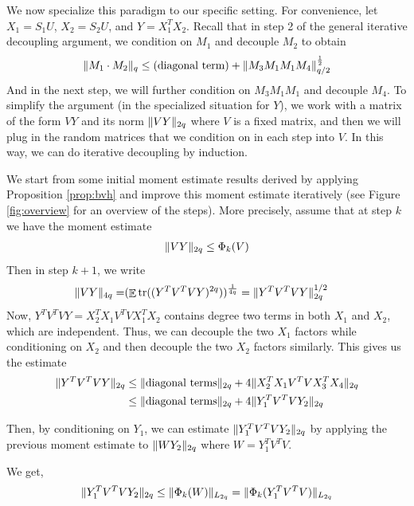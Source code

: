 \documentclass[11pt]{amsart}
\numberwithin{equation}{section}
\numberwithin{equation}{section}
\DeclareMathOperator{\E}{\mathbb{E}}
\DeclareMathOperator*{\tr}{tr}
\DeclarePairedDelimiter{\norm}{\lVert}{\rVert}
\begin{document}
We now specialize this paradigm to our specific setting. For convenience, let $X_1=S_1U$, $X_2=S_2U$, and $Y=X_1^TX_2$. Recall that in step 2 of the general iterative decoupling argument, we condition on $M_1$ and decouple $M_2$ to obtain
\begin{align*}
    \norm{M_1 \cdot M_2}_{q} \le \text{(diagonal term)}+\norm{M_3M_1M_1M_4}_{q/2}^\frac{1}{2}
\end{align*}
And in the next step, we will further condition on $M_3M_1M_1$ and decouple $M_4$.
To simplify the argument (in the specialized situation for $Y$), we work with a matrix of the form $VY$ and its norm $\norm{VY}_{2q}$ where $V$ is a fixed matrix, and then we will plug in the random matrices that we condition on in each step  into $V$. In this way, we can do iterative decoupling by induction.



We start from some initial moment estimate results derived by applying Proposition \ref{prop:bvh} and improve this moment estimate iteratively (see Figure \ref{fig:overview} for an overview of the steps).  More precisely, assume that at step $k$ we have the moment estimate
\begin{align*}
    \norm{VY}_{2q} \le \Phi_{k}(V)
\end{align*}
Then in step $k+1$, we write 
\begin{align*}
    \norm{VY}_{4q}=&(\E\tr((Y^TV^TVY)^{2q}))^{\frac{1}{4q}}= \norm{Y^TV^TVY}_{2q}^{1/2}
\end{align*}
Now, $Y^TV^TVY = X_2^TX_1V^TVX_1^TX_2$ contains degree two terms in both $X_1$ and $X_2$, which are independent. Thus, we can decouple the two $X_1$ factors while conditioning on $X_2$ and then decouple the two $X_2$ factors similarly. This gives us the estimate
\begin{align*}
    \norm{Y^TV^TVY}_{2q} &\le \norm{\text{diagonal terms}}_{2q}+4\norm{X_2^TX_1V^TVX_3^TX_4}_{2q} \\
    &\le \norm{\text{diagonal terms}}_{2q}+4\norm{Y_1^TV^TVY_2}_{2q}
\end{align*}

Then, by conditioning on $Y_1$, we can estimate $\norm{Y_1^TV^TVY_2}_{2q}$ by applying the previous moment estimate to $\norm{WY_2}_{2q}$ where $W=Y_1^TV^TV$. 


We get,
\begin{align*}
\norm{Y_1^TV^TVY_2}_{2q} \le \norm{\Phi_k(W)}_{L_{2q}}=\norm{\Phi_k(Y_1^TV^TV)}_{L_{2q}}
\end{align*}
\end{document}
